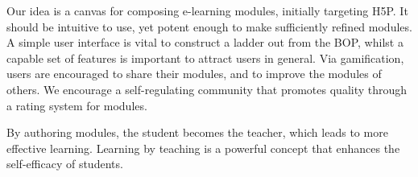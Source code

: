 Our idea is a canvas for composing e-learning modules, initially targeting 
H5P. It should be intuitive to use, yet potent enough to make sufficiently 
refined modules. A simple user interface is vital to construct a ladder out 
from the BOP, whilst a capable set of features is important to attract users 
in general. Via gamification, users are encouraged to share their modules, and 
to improve the modules of others. We encourage a self-regulating community 
that promotes quality through a rating system for modules.

By authoring modules, the student becomes the teacher, which leads to more 
effective learning. Learning by teaching is a powerful concept that enhances 
the self-efficacy of students.
